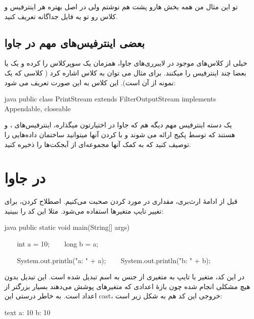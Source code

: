 تو این مثال من همه بخش هارو پشت هم نوشتم ولی در اصل بهتره هر اینترفیس و
کلاس رو تو یه فایل جداگانه تعریف کنید.

\subsection{بعضی اینترفیس‌های مهم در جاوا}

خیلی از کلاس‌های موجود در لایبرری‌های جاوا، همزمان یک سوپرکلاس را
 کرده و یک یا بعضا چند اینترفیس را  میکنند.
برای مثال می توان به کلاس  اشاره کرد ( کلاسی که
 یک نمونه  از آن است). این کلاس
به این صورت تعریف می شود:

\begin{codebox}{java}
public class PrintStream extends FilterOutputStream implements Appendable, closeable {

}
\end{codebox}

یک دسته اینترفیس مهم دیگه هم که جاوا در اختیارتون میگذاره، اینترفیس‌های
،  و  هستند که توسط
پکیج  ارائه می شوند و با  کردن آنها
میتوانید ساختمان داده‌هایی را توصیف کنید که به کمک آنها مجموعه‌ای از
آبجکت‌ها را ذخیره کنید.

\section{ در جاوا}

قبل از ادامهٔ ارث‌بری، مقداری در مورد  کردن صحبت می‌کنیم. اصطلاح
 کردن، برای تغییر تایپ متغیرها استفاده می‌شود. مثلا این کد را
ببینید:

\begin{codebox}{java}
public static void main(String[] args) {
    int a = 10;
    long b = a;  
  
    System.out.println("a: " + a);  
    System.out.println("b: " + b);  
}
\end{codebox}

در این کد، متغیر  با تایپ  به متغیری از
جنس  به اسم  تبدیل شده است. این تبدیل
بدون هیچ مشکلی انجام شده چون بازهٔ اعدادی که متغیرهای 
پوشش می‌دهند بسیار بزرگتر از اعداد  است. به خاطر درستی
این cast، خروجی این کد هم به شکل زیر است:

\begin{codebox}{text}
a: 10  
b: 10
\end{codebox}


